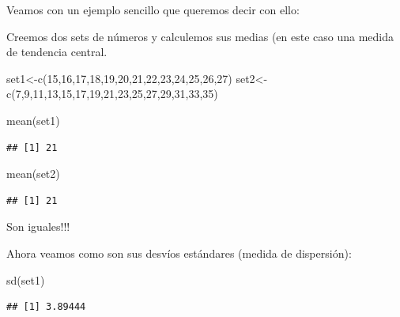 \documentclass[
]{book}
\newenvironment{Shaded}{\begin{snugshade}}{\end{snugshade}}
\newcommand{\DecValTok}[1]{\textcolor[rgb]{0.00,0.00,0.81}{#1}}
\newcommand{\FunctionTok}[1]{\textcolor[rgb]{0.00,0.00,0.00}{#1}}
\newcommand{\NormalTok}[1]{#1}
\newcommand{\OtherTok}[1]{\textcolor[rgb]{0.56,0.35,0.01}{#1}}
\begin{document}
Veamos con un ejemplo sencillo que queremos decir con ello:

Creemos dos sets de números y calculemos sus medias (en este caso una medida de tendencia central.

\begin{Shaded}
\begin{Highlighting}[]
\NormalTok{set1}\OtherTok{\textless{}{-}}\FunctionTok{c}\NormalTok{(}\DecValTok{15}\NormalTok{,}\DecValTok{16}\NormalTok{,}\DecValTok{17}\NormalTok{,}\DecValTok{18}\NormalTok{,}\DecValTok{19}\NormalTok{,}\DecValTok{20}\NormalTok{,}\DecValTok{21}\NormalTok{,}\DecValTok{22}\NormalTok{,}\DecValTok{23}\NormalTok{,}\DecValTok{24}\NormalTok{,}\DecValTok{25}\NormalTok{,}\DecValTok{26}\NormalTok{,}\DecValTok{27}\NormalTok{)}
\NormalTok{set2}\OtherTok{\textless{}{-}}\FunctionTok{c}\NormalTok{(}\DecValTok{7}\NormalTok{,}\DecValTok{9}\NormalTok{,}\DecValTok{11}\NormalTok{,}\DecValTok{13}\NormalTok{,}\DecValTok{15}\NormalTok{,}\DecValTok{17}\NormalTok{,}\DecValTok{19}\NormalTok{,}\DecValTok{21}\NormalTok{,}\DecValTok{23}\NormalTok{,}\DecValTok{25}\NormalTok{,}\DecValTok{27}\NormalTok{,}\DecValTok{29}\NormalTok{,}\DecValTok{31}\NormalTok{,}\DecValTok{33}\NormalTok{,}\DecValTok{35}\NormalTok{)}

\FunctionTok{mean}\NormalTok{(set1)}
\end{Highlighting}
\end{Shaded}

\begin{verbatim}
## [1] 21
\end{verbatim}

\begin{Shaded}
\begin{Highlighting}[]
\FunctionTok{mean}\NormalTok{(set2)}
\end{Highlighting}
\end{Shaded}

\begin{verbatim}
## [1] 21
\end{verbatim}

Son iguales!!!

Ahora veamos como son sus desvíos estándares (medida de dispersión):

\begin{Shaded}
\begin{Highlighting}[]
\FunctionTok{sd}\NormalTok{(set1)}
\end{Highlighting}
\end{Shaded}

\begin{verbatim}
## [1] 3.89444
\end{verbatim}
\end{document}
